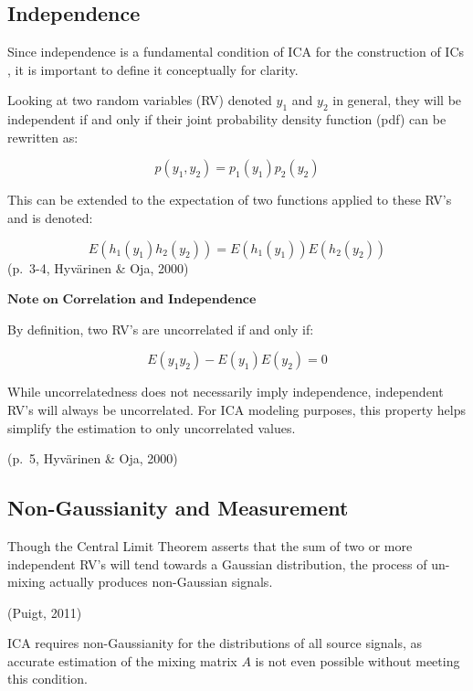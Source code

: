 \documentclass[12pt,twoside]{amherstthesis}
\begin{document}
  \subsection{Independence}\label{independence}
  
  Since independence is a fundamental condition of ICA for the
  construction of ICs , it is important to define it conceptually for
  clarity.
  
  Looking at two random variables (RV) denoted \(y_1\) and \(y_2\) in
  general, they will be independent if and only if their joint probability
  density function (pdf) can be rewritten as:
  
  \[p(y_1,y_2) = p_1(y_1)p_2(y_2)\]
  
  This can be extended to the expectation of two functions applied to
  these RV's and is denoted:
  
  \[E(h_1(y_1)h_2(y_2)) = E(h_1(y_1))E(h_2(y_2))\] (p.~3-4, Hyvärinen \&
  Oja, 2000) \newline
  
  \(\textbf{Note on Correlation and Independence}\) \newline
  
  By definition, two RV's are uncorrelated if and only if:
  
  \[E({y_1y_2}) - E({y_1})E({y_2}) = 0\]
  
  While uncorrelatedness does not necessarily imply independence,
  independent RV's will always be uncorrelated. For ICA modeling purposes,
  this property helps simplify the estimation to only uncorrelated values.
  
  (p.~5, Hyvärinen \& Oja, 2000)
  
  \subsection{Non-Gaussianity and
  Measurement}\label{non-gaussianity-and-measurement}
  
  Though the Central Limit Theorem asserts that the sum of two or more
  independent RV's will tend towards a Gaussian distribution, the process
  of un-mixing actually produces non-Gaussian signals.
  
  (Puigt, 2011) \newline
  
  ICA requires non-Gaussianity for the distributions of all source
  signals, as accurate estimation of the mixing matrix \(A\) is not even
  possible without meeting this condition.
  
\end{document}
